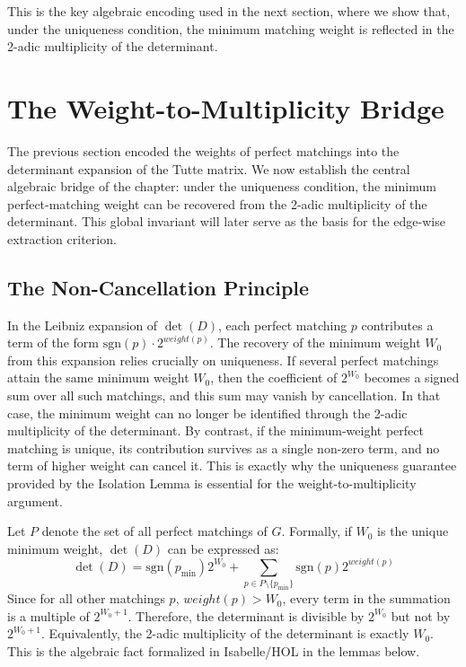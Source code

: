 This is the key algebraic encoding used in the next section, where we show that, under the uniqueness condition, the minimum matching weight is reflected in the 2-adic multiplicity of the determinant.

\section{The Weight-to-Multiplicity Bridge}
\label{sec:weight_multiplicity}

The previous section encoded the weights of perfect matchings into the determinant expansion of the Tutte matrix.
We now establish the central algebraic bridge of the chapter: under the uniqueness condition, the minimum perfect-matching weight can be recovered from the 2-adic multiplicity of the determinant.
This global invariant will later serve as the basis for the edge-wise extraction criterion.

\subsection{The Non-Cancellation Principle}
In the Leibniz expansion of $\det(D)$, each perfect matching $p$ contributes a term of the form $\text{sgn}(p) \cdot 2^{weight(p)}$.
The recovery of the minimum weight $W_0$ from this expansion relies crucially on uniqueness.
If several perfect matchings attain the same minimum weight $W_0$, then the coefficient of $2^{W_0}$ becomes a signed sum over all such matchings, and this sum may vanish by cancellation.
In that case, the minimum weight can no longer be identified through the 2-adic multiplicity of the determinant.
By contrast, if the minimum-weight perfect matching is unique, its contribution survives as a single non-zero term, and no term of higher weight can cancel it.
This is exactly why the uniqueness guarantee provided by the Isolation Lemma is essential for the weight-to-multiplicity argument.

Let \(P\) denote the set of all perfect matchings of \(G\).
Formally, if $W_0$ is the unique minimum weight, $\det(D)$ can be expressed as:
\begin{equation}
    \det(D) = \text{sgn}(p_{\min}) 2^{W_0} + 
    \sum_{p \in P \setminus \{p_{\min}\}} \text{sgn}(p) 2^{weight(p)}
\end{equation}
Since for all other matchings $p$, $weight(p) > W_0$, every term in the summation is a multiple of $2^{W_0+1}$.
Therefore, the determinant is divisible by $2^{W_0}$ but not by $2^{W_0+1}$.
Equivalently, the 2-adic multiplicity of the determinant is exactly $W_0$.
This is the algebraic fact formalized in Isabelle/HOL in the lemmas below.

